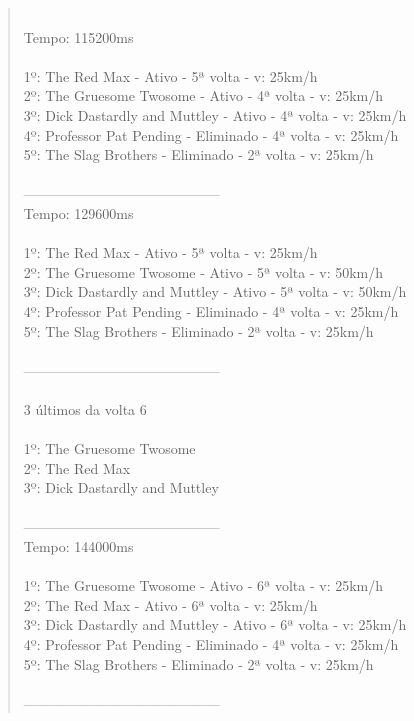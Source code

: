 \documentclass[paper=a4, fontsize=11pt]{scrartcl}
\numberwithin{equation}{section}		%
\numberwithin{figure}{section}			%
\numberwithin{table}{section}				%
\begin{document}
\begin{quote}
\\Tempo: 115200ms
\\
\\1º: The Red Max - Ativo - 5ª volta - v: 25km/h
\\2º: The Gruesome Twosome - Ativo - 4ª volta - v: 25km/h
\\3º: Dick Dastardly and Muttley - Ativo - 4ª volta - v: 25km/h
\\4º: Professor Pat Pending - Eliminado - 4ª volta - v: 25km/h
\\5º: The Slag Brothers - Eliminado - 2ª volta - v: 25km/h
\\
\\------------------------------------------
\\Tempo: 129600ms
\\
\\1º: The Red Max - Ativo - 5ª volta - v: 25km/h
\\2º: The Gruesome Twosome - Ativo - 5ª volta - v: 50km/h
\\3º: Dick Dastardly and Muttley - Ativo - 5ª volta - v: 50km/h
\\4º: Professor Pat Pending - Eliminado - 4ª volta - v: 25km/h
\\5º: The Slag Brothers - Eliminado - 2ª volta - v: 25km/h
\\
\\------------------------------------------
\\
\\3 últimos da volta 6
\\
\\1º: The Gruesome Twosome
\\2º: The Red Max
\\3º: Dick Dastardly and Muttley
\\
\\------------------------------------------
\\Tempo: 144000ms
\\
\\1º: The Gruesome Twosome - Ativo - 6ª volta - v: 25km/h
\\2º: The Red Max - Ativo - 6ª volta - v: 25km/h
\\3º: Dick Dastardly and Muttley - Ativo - 6ª volta - v: 25km/h
\\4º: Professor Pat Pending - Eliminado - 4ª volta - v: 25km/h
\\5º: The Slag Brothers - Eliminado - 2ª volta - v: 25km/h
\\
\\------------------------------------------

\end{quote}
\end{document}
